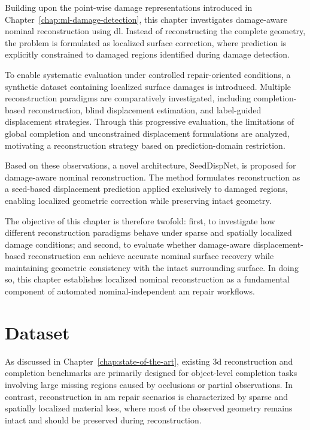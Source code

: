 Building upon the point-wise damage representations introduced in Chapter~\ref{chap:ml-damage-detection}, this chapter investigates damage-aware nominal reconstruction using \ac{dl}. Instead of reconstructing the complete geometry, the problem is formulated as localized surface correction, where prediction is explicitly constrained to damaged regions identified during damage detection.

To enable systematic evaluation under controlled repair-oriented conditions, a synthetic dataset containing localized surface damages is introduced. Multiple reconstruction paradigms are comparatively investigated, including completion-based reconstruction, blind displacement estimation, and label-guided displacement strategies. Through this progressive evaluation, the limitations of global completion and unconstrained displacement formulations are analyzed, motivating a reconstruction strategy based on prediction-domain restriction.

Based on these observations, a novel architecture, SeedDispNet, is proposed for damage-aware nominal reconstruction. The method formulates reconstruction as a seed-based displacement prediction applied exclusively to damaged regions, enabling localized geometric correction while preserving intact geometry.

The objective of this chapter is therefore twofold: first, to investigate how different reconstruction paradigms behave under sparse and spatially localized damage conditions; and second, to evaluate whether damage-aware displacement-based reconstruction can achieve accurate nominal surface recovery while maintaining geometric consistency with the intact surrounding surface. In doing so, this chapter establishes localized nominal reconstruction as a fundamental component of automated nominal-independent \ac{am} repair workflows.

\section{Dataset}
\label{sec:dataset_7}

As discussed in Chapter~\ref{chap:state-of-the-art}, existing \ac{3d} reconstruction and completion benchmarks are primarily designed for object-level completion tasks involving large missing regions caused by occlusions or partial observations. In contrast, reconstruction in \ac{am} repair scenarios is characterized by sparse and spatially localized material loss, where most of the observed geometry remains intact and should be preserved during reconstruction.

